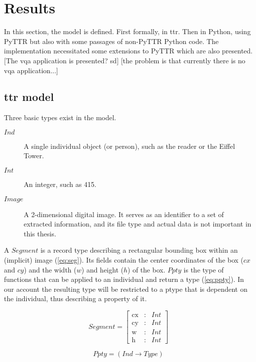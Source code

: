 \section{Results}
\label{sec:results}

In this section, the model is defined.
First formally, in \gls{ttr}.
Then in Python, using PyTTR but also with some passages of non-PyTTR Python code.
The implementation necessitated some extensions to PyTTR which are also presented.
[The vqa application is presented? sd] [the problem is that currently there is no vqa application...]



\subsection{\Gls{ttr} model}
\label{ssec:ttrmodel}

Three basic types exist in the model.

\begin{description}
\item [$Ind$] A single individual object (or person), such as the reader or the Eiffel Tower.
\item [$Int$] An integer, such as 415.
\item [$Image$] A 2-dimensional digital image. It serves as an identifier to a set of extracted information, and its file type and actual data is not important in this thesis.
\end{description}

A $Segment$ is a record type describing a rectangular bounding box within an (implicit) image (\autoref{eq:seg}).
Its fields contain the center coordinates of the box ($cx$ and $cy$) and the width ($w$) and height ($h$) of the box.
$Ppty$ is the type of functions that can be applied to an individual and return a type (\autoref{eq:ppty}).
In our account the resulting type will be restricted to a ptype that is dependent on the individual, thus describing a property of it.

\begin{equation}\label{eq:seg}
Segment = \left[\begin{array}{rcl}
\text{cx} &:& Int\\
\text{cy} &:& Int\\
\text{w} &:& Int\\
\text{h} &:& Int
\end{array}\right]\end{equation}

\begin{equation}\label{eq:ppty}
Ppty = (Ind \rightarrow Type)\end{equation}

